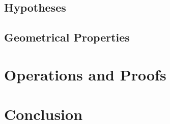 \documentclass[handout]{beamer}
\begin{document}
\begin{frame}
 
\end{frame}


\subsection{Hypotheses}

\begin{frame}
 
\end{frame}


\subsection{Geometrical Properties}

\begin{frame}
 
\end{frame}


\section{Operations and Proofs}

\begin{frame}
 
\end{frame}

\section{Conclusion}

\begin{frame}

 
\end{frame}
\end{document}
